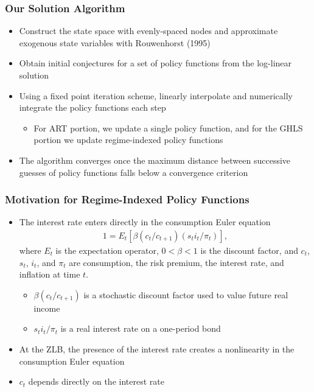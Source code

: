 \documentclass[11pt]{beamer}
\begin{document}
\begin{frame}\frametitle{Our Solution Algorithm} %
\begin{itemize}\setlength{\itemsep}{8pt}
\item   Construct the state space with evenly-spaced nodes and approximate exogenous state variables with Rouwenhorst (1995)
\item  Obtain initial conjectures for a set of policy functions from the log-linear solution
\item  Using a fixed point iteration scheme, linearly interpolate and numerically integrate the policy functions each step
\begin{itemize}
\item  For ART portion, we update a single policy function, and for the GHLS portion we update regime-indexed policy functions
\end{itemize}
\item  The algorithm converges once the maximum distance between successive guesses of policy functions falls below a convergence criterion

\end{itemize}
\end{frame}
\begin{frame}\frametitle{Motivation for Regime-Indexed Policy Functions}
\begin{itemize}\setlength{\itemsep}{6pt}
\item  The interest rate enters directly in the consumption Euler equation
\begin{gather*}
1 =  E_t[\beta(c_t/c_{t+1})(s_ti_t/\pi_t)],
\end{gather*}
where $E_t$ is the expectation operator, $0 < \beta < 1$ is the discount factor, and $c_t$, $s_t$, $i_t$, and $\pi_t$ are consumption, the risk premium, the interest rate, and inflation at time $t$. 
\begin{itemize} \small
\item $\beta(c_t/c_{t+1})$ is a stochastic discount factor used to value future real income
\item $s_ti_t/\pi_t$ is a real interest rate on a one-period bond
\end{itemize}\normalfont
\item  At the ZLB, the presence of the interest rate creates a nonlinearity in the consumption Euler equation 
\item  $c_t$ depends directly on the interest rate
\end{itemize}
\end{frame}
\end{document}
